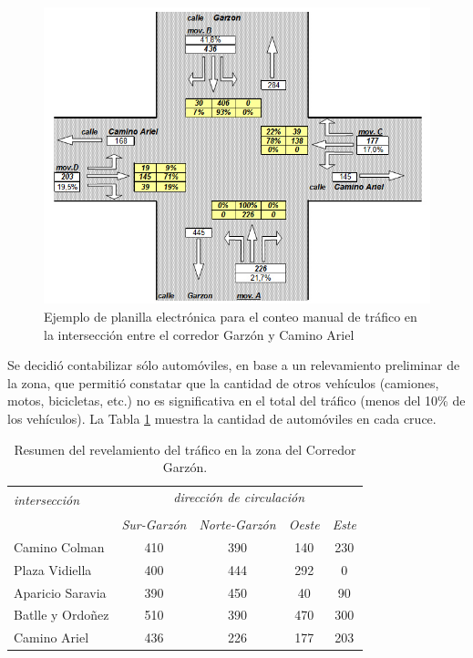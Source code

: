\begin{figure}[ht]
	\centering
	\includegraphics[width=0.9\linewidth]{Figures/conteo_hoja}
	\caption[Ejemplo de planilla electrónica para el conteo manual de tráfico.]{Ejemplo de planilla electrónica para el conteo manual de tráfico en la intersección entre el corredor Garzón y Camino Ariel}
	\label{fig:conteo_hoja}
\end{figure}





Se decidió contabilizar sólo automóviles, en base a un relevamiento preliminar de la zona, que permitió constatar que la cantidad de otros vehículos (camiones, motos, bicicletas, etc.) no es significativa en el total del tráfico (menos del 10\% de los vehículos). La Tabla \ref{table:resumen_trafico} muestra la cantidad de automóviles en cada cruce.

\begin{table}[ht]
	\renewcommand{\arraystretch}{1.0}
\renewcommand{\tabcolsep}{8pt}
	\caption[Resumen del revelamiento del tráfico en la zona del Corredor Garzón.]{Resumen del revelamiento del tráfico en la zona del Corredor Garzón.}
	\label{table:resumen_trafico}
	\centering
	\begin{tabular}{lcccc}
		\toprule
		\multirow{2}{*}{\textit{intersección}}&\multicolumn{4}{c}{\textit{dirección de circulación}}\\
		\cline{2-5}\\[-9pt]
		& \textit{Sur-Garzón} & \textit{Norte-Garzón} & \textit{Oeste} & \textit{Este} \\ 
		\midrule
		Camino Colman  & 410 & 390 & 140 & 230\\		
		Plaza Vidiella  & 400 & 444 & 292 & 0\\		
		Aparicio Saravia  & 390 & 450 & 40 & 90\\		
		Batlle y Ordoñez  & 510 & 390 & 470 & 300 \\	
		Camino Ariel  & 436 & 226 & 177 & 203 \\													
		\bottomrule
	\end{tabular}
\end{table}

